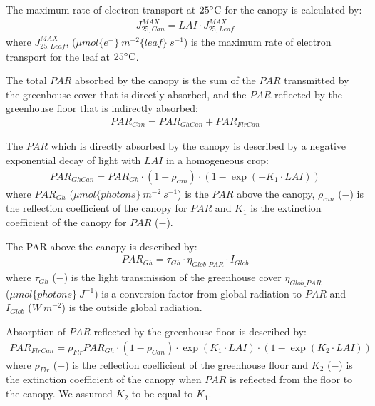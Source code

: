 \documentclass[a4paper]{article}
\numberwithin{equation}{section}
\begin{document}
The maximum rate of electron transport at \( 25 \celsius \) for the canopy is calculated by:
\begin{align}
  J^{MAX}_{25,Can} = LAI \cdot J^{MAX}_{25,Leaf}
\end{align}
where \( J^{MAX}_{25,Leaf} \), (\( \mu mol\{e^-\}\ m^{-2}\{leaf\}\ s^{-1} \)) is the maximum rate of electron transport for the leaf at \( 25 \celsius \).

The total \( PAR \) absorbed by the canopy is the sum of the \( PAR \) transmitted by the greenhouse cover that is directly absorbed, and the \( PAR \) reflected by the greenhouse floor that is indirectly absorbed:
\begin{align}
  PAR_{Can} = PAR_{GhCan} + PAR_{FlrCan}
\end{align}

The \( PAR \) which is directly absorbed by the canopy is described by a negative exponential decay of light with \( LAI \) in a homogeneous crop:
\begin{align}
  PAR_{GhCan} = PAR_{Gh}\cdot (1-\rho_{can})\cdot(1 - \exp \left(-K_1\cdot LAI\right))
\end{align}
where \( PAR_{Gh} \) (\( \mu mol \{photons\}\ m^{-2}\ s^{-1} \)) is the \( PAR \) above the canopy, \( \rho_{can} \) (\( - \)) is the reflection coefficient of the canopy for \( PAR \) and \( K_1 \) is the extinction coefficient of the canopy for \( PAR \) (\( - \)).

The PAR above the canopy is described by:
\begin{align}
  PAR_{Gh} = \tau_{Gh} \cdot \eta_{Glob\_PAR}\cdot I_{Glob}
\end{align}
where \( \tau_{Gh} \) (\( - \)) is the light transmission of the greenhouse cover \( \eta_{Glob\_PAR} \) \\    (\( \mu mol\{photons\}\ J^{-1} \)) is a conversion factor from global radiation to \( PAR \) and \( I_{Glob} \) (\( W\ m^{-2} \)) is the outside global radiation.

Absorption of \( PAR \) reflected by the greenhouse floor is described by:
\begin{align}
  PAR_{FlrCan} = \rho_{Flr}PAR_{Gh}\cdot (1-\rho_{Can})\cdot \exp \left(K_1\cdot LAI\right) \cdot (1 - \exp \left(K_2\cdot LAI\right))
\end{align}
where \( \rho_{Flr} \) (\( - \)) is the reflection coefficient of the greenhouse floor and \( K_2 \) (\( - \)) is the extinction coefficient of the canopy when \( PAR \) is reflected from the floor to the canopy. We assumed \( K_2 \) to be equal to \( K_1 \).
\end{document}
